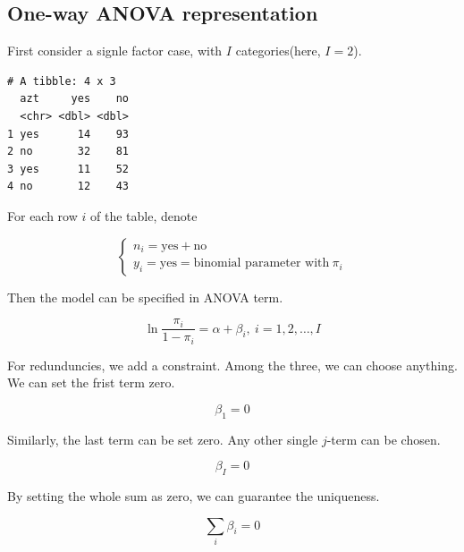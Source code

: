 \documentclass[]{book}
\newenvironment{Shaded}{\begin{snugshade}}{\end{snugshade}}
\newcommand{\KeywordTok}[1]{\textcolor[rgb]{0.13,0.29,0.53}{\textbf{#1}}}
\newcommand{\NormalTok}[1]{#1}
\newcommand{\OperatorTok}[1]{\textcolor[rgb]{0.81,0.36,0.00}{\textbf{#1}}}
\newcommand{\StringTok}[1]{\textcolor[rgb]{0.31,0.60,0.02}{#1}}
\begin{document}
\hypertarget{one-way-anova-representation}{%
\subsection{One-way ANOVA representation}\label{one-way-anova-representation}}

First consider a signle factor case, with \(I\) categories(here, \(I = 2\)).

\begin{Shaded}
\end{Shaded}

\begin{verbatim}
# A tibble: 4 x 3
  azt     yes    no
  <chr> <dbl> <dbl>
1 yes      14    93
2 no       32    81
3 yes      11    52
4 no       12    43
\end{verbatim}

For each row \(i\) of the table, denote

\[
\begin{cases}
n_i = \text{yes} + \text{no} \\
y_i = \text{yes} = \text{binomial parameter with}\: \pi_i
\end{cases}
\]

Then the model can be specified in ANOVA term.

\begin{equation}
\ln\frac{\pi_i}{1 - \pi_i} = \alpha + \beta_i, \: i = 1, 2, \ldots, I
\label{eq:anovatype}
\end{equation}

For redunduncies, we add a constraint. Among the three, we can choose anything. We can set the frist term zero.

\begin{equation}
\beta_1 = 0
\label{eq:dumfirst}
\end{equation}

Similarly, the last term can be set zero. Any other single \(j\)-term can be chosen.

\begin{equation}
\beta_I = 0
\label{eq:dumlast}
\end{equation}

By setting the whole sum as zero, we can guarantee the uniqueness.

\begin{equation}
\sum_i \beta_i = 0
\label{eq:eff}
\end{equation}
\end{document}
